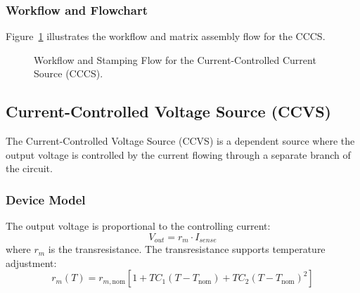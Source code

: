 \subsubsection{Workflow and Flowchart}
Figure~\ref{fig:cccs_flowchart} illustrates the workflow and matrix assembly flow for the CCCS.

\begin{figure}[H]
    \centering
    \caption{Workflow and Stamping Flow for the Current-Controlled Current Source (CCCS).}
    \label{fig:cccs_flowchart}
\end{figure}

\subsection{Current-Controlled Voltage Source (CCVS)}
The Current-Controlled Voltage Source (CCVS) is a dependent source where the output voltage is controlled by the current flowing through a separate branch of the circuit.

\subsubsection{Device Model}
The output voltage is proportional to the controlling current:
\begin{equation}
    V_{out} = r_m \cdot I_{sense}
\end{equation}
where $r_m$ is the transresistance. The transresistance supports temperature adjustment:
\begin{equation}
    r_m(T) = r_{m,\text{nom}} \left[ 1 + TC_1 (T - T_{\text{nom}}) + TC_2 (T - T_{\text{nom}})^2 \right]
\end{equation}


